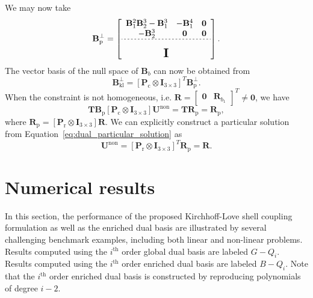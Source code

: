 We may now take
\begin{equation}
	\mathbf{B}^\perp_\text{p}=
	\left[\begin{array}{ccc}
			\mathbf{B}_1^2\mathbf{B}_2^3-\mathbf{B}_1^3 & -\mathbf{B}_1^4 & \mathbf{0}        \\
			-\mathbf{B}_2^3                             & \mathbf{0}      & \mathbf{0}        \\ \hdashline[2pt/2pt]
			\multicolumn{3}{c}{\multirow{3}{*}{\raisebox{0mm}{\scalebox{1.5}{$\mathbf{I}$}}}} \\
			                                            &                 &
		\end{array}\right].
\end{equation}
The vector basis of the null space of $\mathbf{B}_b$ can now be obtained from
\begin{equation}
	\mathbf{B}^\perp_\text{kl}=\left[\mathbf{P}_\text{c}\otimes\mathbf{I}_{3\times 3}\right]^T\mathbf{B}^\perp_\text{p}.
\end{equation}
When the constraint is not homogeneous, i.e. $\mathbf{R}=\begin{bmatrix}
		\mathbf{0} & \mathbf{R}_{b_1}
	\end{bmatrix}^T\neq \mathbf{0}$, we have
\begin{equation}
	\mathbf{T}\mathbf{B}_\text{p}\left[\mathbf{P}_\text{c}\otimes\mathbf{I}_{3\times 3}\right]\mathbf{U}^\text{non} = \mathbf{T}\mathbf{R}_\text{p} = \mathbf{R}_\text{p},
\end{equation}
where $\mathbf{R}_\text{p}=\left[ \mathbf{P}_\text{r}\otimes\mathbf{I}_{3\times 3} \right]\mathbf{R}$. We can explicitly construct a particular solution from Equation~\eqref{eq:dual_particular_solution} as
\begin{equation}
	\mathbf{U}^\text{non} = \left[ \mathbf{P}_\text{r}\otimes\mathbf{I}_{3\times 3} \right]^T\mathbf{R}_\text{p} = \mathbf{R}.
\end{equation}

\section{Numerical results}\label{sec:numerical}

In this section, the performance of the proposed Kirchhoff-Love shell coupling formulation as well as the enriched \Bezier dual basis are illustrated by several challenging benchmark examples, including both linear and non-linear problems. Results computed using the $i^\text{th}$ order global dual basis are labeled $G-Q_i$. Results computed using the $i^\text{th}$ order enriched \Bezier dual basis are labeled $B-Q_i$. Note that the $i^\text{th}$ order enriched \Bezier dual basis is constructed by reproducing polynomials of degree $i-2$.

